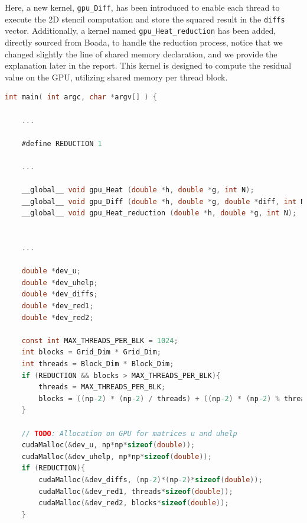 \documentclass[titlepage]{article}
\newcommand{\incode}[1]{\lstinline[style=inlineC,language=C]{#1}}
\begin{document}
Here, a new kernel, \incode{gpu_Diff}, has been introduced to enable each thread to execute the 2D stencil computation and store the squared result in the \incode{diffs} vector. Additionally, a kernel named \incode{gpu_Heat_reduction} has been added, directly sourced from Boada, to handle the reduction process, notice that we changed slightly the line of shared memory declaration, and we provide the explanation later in the report. This kernel is designed to compute the residual value on the GPU, utilizing shared memory per thread block.

\begin{lstlisting}[style=c, language=C, caption=Modified heat-CUDA.c, captionpos=b]
int main( int argc, char *argv[] ) {

    ...
    
    #define REDUCTION 1

    ...
    
    __global__ void gpu_Heat (double *h, double *g, int N);
    __global__ void gpu_Diff (double *h, double *g, double *diff, int N);
    __global__ void gpu_Heat_reduction (double *h, double *g, int N);


    ...
    
    double *dev_u;
    double *dev_uhelp;
    double *dev_diffs;
    double *dev_red1;
    double *dev_red2;

    const int MAX_THREADS_PER_BLK = 1024;
    int blocks = Grid_Dim * Grid_Dim; 
    int threads = Block_Dim * Block_Dim; 
    if (REDUCTION && blocks > MAX_THREADS_PER_BLK){
        threads = MAX_THREADS_PER_BLK;
        blocks = ((np-2) * (np-2) / threads) + ((np-2) * (np-2) % threads != 0);
    }

    // TODO: Allocation on GPU for matrices u and uhelp
    cudaMalloc(&dev_u, np*np*sizeof(double));
    cudaMalloc(&dev_uhelp, np*np*sizeof(double));
    if (REDUCTION){
        cudaMalloc(&dev_diffs, (np-2)*(np-2)*sizeof(double));
        cudaMalloc(&dev_red1, threads*sizeof(double));
        cudaMalloc(&dev_red2, blocks*sizeof(double));
    }


\end{lstlisting}
\end{document}
